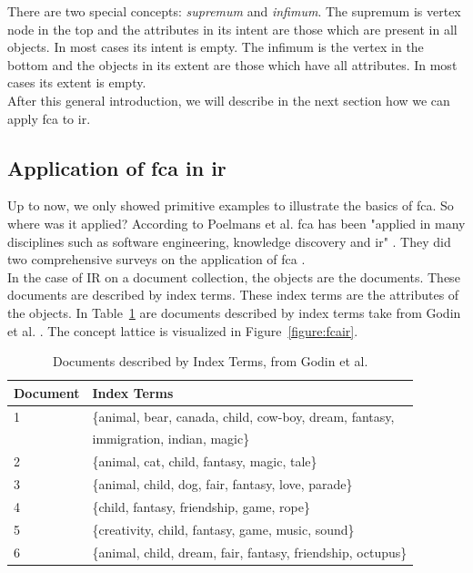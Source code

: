 \documentclass[11pt]{report}
\begin{document}
There are two special concepts: \textit{supremum} and \textit{infimum}. The supremum is vertex node in the top and the attributes in its intent are those which are present in all objects. In most cases its intent is empty. The infimum is the vertex in the bottom and the objects in its extent are those which have all attributes. In most cases its extent is empty.\\

After this general introduction, we will describe in the next section how we can apply \acrshort{fca} to \acrshort{ir}.

\subsection{Application of \acrshort{fca} in \acrshort{ir}}
\label{section:fcair}

Up to now, we only showed primitive examples to illustrate the basics of \acrshort{fca}. So where was it applied? According to Poelmans et al. \acrshort{fca} has been "applied in many disciplines such as software engineering, knowledge discovery and \acrshort{ir}" \cite{Poelmans2013}. They did two comprehensive surveys on the application of \acrshort{fca} \cite{Poelmans2013, Poelmans2013b}. \\

In the case of IR on a document collection, the objects are the documents. These documents are described by index terms. These index terms are the attributes of the objects. In Table~\ref{table:fcair} are documents described by index terms take from Godin et al. \cite{Godin1993}. The concept lattice is visualized in Figure~\ref{figure:fcair}.

\begin{table}[h]
\caption{Documents described by Index Terms, from Godin et al. \cite{Godin1993}}
\label{table:fcair}
\centering

\def\arraystretch{1.2}%
\begin{tabular}{ | l | l | }
\hline
 Document & Index Terms \\
\hline

1 & \{animal, bear, canada, child, cow-boy, dream, fantasy,\\
  & immigration, indian, magic\} \\
2 & \{animal, cat, child, fantasy, magic, tale\} \\
3 & \{animal, child, dog, fair, fantasy, love, parade\} \\
4 & \{child, fantasy, friendship, game, rope\} \\
5 & \{creativity, child, fantasy, game, music, sound\} \\
6 & \{animal, child, dream, fair, fantasy, friendship, octupus\} \\

\hline
\end{tabular}
\end{table}
\end{document}
